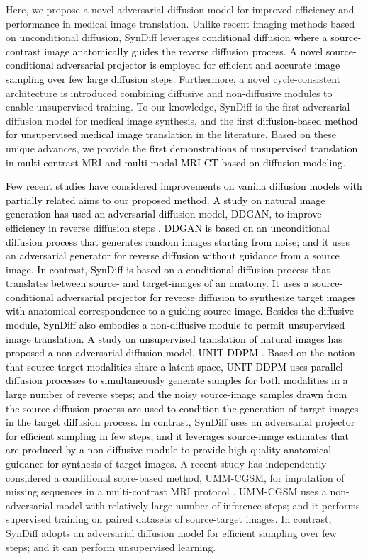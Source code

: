 \documentclass[journal,twoside,web]{ieeecolor}
\newcommand*{\revhl}{\textcolor{black}}
\begin{document}
Here, we propose a novel adversarial diffusion model for improved efficiency and performance in medical image translation. Unlike recent imaging methods based on unconditional diffusion, SynDiff leverages \revhl{conditional diffusion where a source-contrast image anatomically guides the reverse diffusion process. A novel source-conditional adversarial projector is employed for efficient and accurate image sampling over few large diffusion steps.} Furthermore, a novel cycle-consistent architecture is introduced combining diffusive and non-diffusive modules to enable unsupervised training. To our knowledge, SynDiff is the first adversarial diffusion model for medical image synthesis, and the first \revhl{diffusion-based method for unsupervised medical image translation} in the literature. Based on these unique advances, we provide \revhl{the first demonstrations of unsupervised translation in multi-contrast MRI and multi-modal MRI-CT based on diffusion modeling}.  

\revhl{Few recent studies have considered improvements on vanilla diffusion models with partially related aims to our proposed method. A study on natural image generation has used an adversarial diffusion model, DDGAN, to improve efficiency in reverse diffusion steps \cite{DiffNvidia}. DDGAN is based on an unconditional diffusion process that generates random images starting from noise; and it uses an adversarial generator for reverse diffusion without guidance from a source image. In contrast, SynDiff is based on a conditional diffusion process that translates between source- and target-images of an anatomy. It uses a source-conditional adversarial projector for reverse diffusion to synthesize target images with anatomical correspondence to a guiding source image. Besides the diffusive module, SynDiff also embodies a non-diffusive module to permit unsupervised image translation. A study on unsupervised translation of natural images has proposed a non-adversarial diffusion model, UNIT-DDPM \cite{sasaki2021unit}. Based on the notion that source-target modalities share a latent space, UNIT-DDPM uses parallel diffusion processes to simultaneously generate samples for both modalities in a large number of reverse steps; and the noisy source-image samples drawn from the source diffusion process are used to condition the generation of target images in the target diffusion process. In contrast, SynDiff uses an adversarial projector for efficient sampling in few steps; and it leverages source-image estimates that are produced by a non-diffusive module to provide high-quality anatomical guidance for synthesis of target images.} A recent study has independently considered a conditional score-based method, UMM-CGSM, for imputation of missing sequences in a multi-contrast MRI protocol \cite{meng_arxiv_2022}. UMM-CGSM uses a non-adversarial model with relatively large number of inference steps; and it performs supervised training on paired datasets of source-target images. In contrast, SynDiff adopts an adversarial diffusion model for efficient sampling over few steps; and it can perform unsupervised learning.
\end{document}
